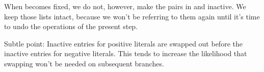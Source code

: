 When  becomes fixed, we do not, however, make the pairs in
 and  inactive. We keep
those lists
intact, because we won't be referring to them again until
it's time to undo the operations of the present step.

Subtle point: Inactive  entries for positive literals are swapped
out
before the inactive  entries for negative literals. This tends to
increase the likelihood that swapping won't be needed on subsequent branches.

